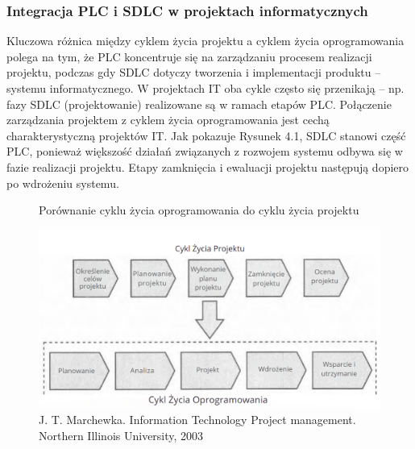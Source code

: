 \subsubsection{Integracja PLC i SDLC w projektach informatycznych}
Kluczowa różnica między cyklem życia projektu a cyklem życia oprogramowania polega na tym, że PLC koncentruje się na zarządzaniu procesem realizacji projektu, podczas gdy SDLC dotyczy tworzenia i implementacji produktu – systemu informatycznego.
W projektach IT oba cykle często się przenikają – np. fazy SDLC (projektowanie) realizowane są w ramach etapów PLC. Połączenie zarządzania projektem z cyklem życia oprogramowania jest cechą charakterystyczną projektów IT. Jak pokazuje Rysunek 4.1, SDLC stanowi część PLC, ponieważ większość działań związanych z rozwojem systemu odbywa się w fazie realizacji projektu. Etapy zamknięcia i ewaluacji projektu następują dopiero po wdrożeniu systemu.\autocite{ITPMMarchewka}

\begin{figure}
    \centering
    \caption{Porównanie cyklu życia oprogramowania do cyklu życia projektu}
    \includegraphics[width=1\linewidth]{img/plc_PL.png}
    \caption*{J. T. Marchewka. Information Technology Project management. Northern Illinois University, 2003}
\end{figure}

